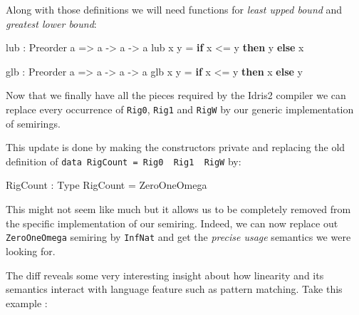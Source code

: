 \documentclass[
]{article}
\newenvironment{Shaded}{}{}
\newcommand{\DataTypeTok}[1]{\textcolor[rgb]{0.56,0.13,0.00}{#1}}
\newcommand{\KeywordTok}[1]{\textcolor[rgb]{0.00,0.44,0.13}{\textbf{#1}}}
\newcommand{\NormalTok}[1]{#1}
\newcommand{\OperatorTok}[1]{\textcolor[rgb]{0.40,0.40,0.40}{#1}}
\newcommand{\OtherTok}[1]{\textcolor[rgb]{0.00,0.44,0.13}{#1}}
\begin{document}
Along with those definitions we will need functions for \emph{least
upped bound} and \emph{greatest lower bound}:

\begin{Shaded}
\begin{Highlighting}[]
\NormalTok{lub }\OperatorTok{:} \DataTypeTok{Preorder}\NormalTok{ a }\OtherTok{=\textgreater{}}\NormalTok{ a }\OtherTok{{-}\textgreater{}}\NormalTok{ a }\OtherTok{{-}\textgreater{}}\NormalTok{ a}
\NormalTok{lub x y }\OtherTok{=} \KeywordTok{if}\NormalTok{ x }\OperatorTok{\textless{}=}\NormalTok{ y }\KeywordTok{then}\NormalTok{ y }\KeywordTok{else}\NormalTok{ x}

\NormalTok{glb }\OperatorTok{:} \DataTypeTok{Preorder}\NormalTok{ a }\OtherTok{=\textgreater{}}\NormalTok{ a }\OtherTok{{-}\textgreater{}}\NormalTok{ a }\OtherTok{{-}\textgreater{}}\NormalTok{ a}
\NormalTok{glb x y }\OtherTok{=} \KeywordTok{if}\NormalTok{ x }\OperatorTok{\textless{}=}\NormalTok{ y }\KeywordTok{then}\NormalTok{ x }\KeywordTok{else}\NormalTok{ y}
\end{Highlighting}
\end{Shaded}

Now that we finally have all the pieces required by the Idris2 compiler
we can replace every occurrence of \texttt{Rig0}, \texttt{Rig1} and
\texttt{RigW} by our generic implementation of semirings.

This update is done by making the constructors private and replacing the
old definition of
\texttt{data\ RigCount\ =\ Rig0\ \textbar{}\ Rig1\ \textbar{}\ RigW} by:

\begin{Shaded}
\begin{Highlighting}[]
\DataTypeTok{RigCount} \OperatorTok{:} \DataTypeTok{Type}
\DataTypeTok{RigCount} \OtherTok{=} \DataTypeTok{ZeroOneOmega}
\end{Highlighting}
\end{Shaded}

This might not seem like much but it allows us to be completely removed
from the specific implementation of our semiring. Indeed, we can now
replace out \texttt{ZeroOneOmega} semiring by \texttt{InfNat} and get
the \emph{precise usage} semantics we were looking for.

The diff reveals some very interesting insight about how linearity and
its semantics interact with language feature such as pattern matching.
Take this example :
\end{document}
